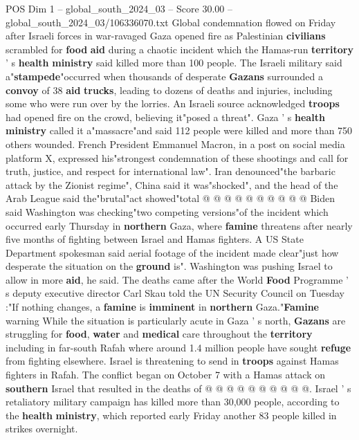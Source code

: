 \begin{textsample}{POS Dim 1 – global\_south\_2024\_03 – Score 30.00 – global\_south\_2024\_03/106336070.txt}  \label{ex:f1_pos_020}
Global condemnation flowed on Friday after Israeli forces in war-ravaged Gaza opened fire as Palestinian \textbf{civilians} scrambled for \textbf{food} \textbf{aid} during a chaotic incident which the Hamas-run \textbf{territory} ' s \textbf{health} \textbf{ministry} said killed more than 100 people.
The Israeli military said a"\textbf{stampede}"occurred when thousands of desperate \textbf{Gazans} surrounded a \textbf{convoy} of 38 \textbf{aid} \textbf{trucks}, leading to dozens of deaths and injuries, including some who were run over by the lorries.
An Israeli source acknowledged \textbf{troops} had opened fire on the crowd, believing it"posed a threat".
Gaza ' s \textbf{health} \textbf{ministry} called it a"massacre"and said 112 people were killed and more than 750 others wounded.
French President Emmanuel Macron, in a post on social media platform X, expressed his"strongest condemnation of these shootings and call for truth, justice, and respect for international law".
Iran denounced"the barbaric attack by the Zionist regime", China said it was"shocked", and the head of the Arab League said the"brutal"act showed"total @ @ @ @ @ @ @ @ @ @ Biden said Washington was checking"two competing versions"of the incident which occurred early Thursday in \textbf{northern} Gaza, where \textbf{famine} threatens after nearly five months of fighting between Israel and Hamas fighters.
A US State Department spokesman said aerial footage of the incident made clear"just how desperate the situation on the \textbf{ground} is".
Washington was pushing Israel to allow in more \textbf{aid}, he said.
The deaths came after the World \textbf{Food} Programme ' s deputy executive director Carl Skau told the UN Security Council on Tuesday :"If nothing changes, a \textbf{famine} is \textbf{imminent} in \textbf{northern} Gaza."\textbf{Famine} warning While the situation is particularly acute in Gaza ' s north, \textbf{Gazans} are struggling for \textbf{food}, \textbf{water} and \textbf{medical} care throughout the \textbf{territory} including in far-south Rafah where around 1.4 million people have sought \textbf{refuge} from fighting elsewhere.
Israel is threatening to send in \textbf{troops} against Hamas fighters in Rafah.
The conflict began on October 7 with a Hamas attack on \textbf{southern} Israel that resulted in the deaths of @ @ @ @ @ @ @ @ @ @.
Israel ' s retaliatory military campaign has killed more than 30,000 people, according to the \textbf{health} \textbf{ministry}, which reported early Friday another 83 people killed in strikes overnight.

\end{textsample}
